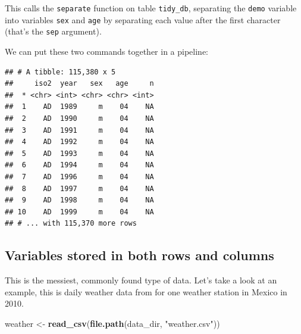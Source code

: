 \documentclass[]{book}
\newenvironment{Shaded}{\begin{snugshade}}{\end{snugshade}}
\newcommand{\KeywordTok}[1]{\textcolor[rgb]{0.13,0.29,0.53}{\textbf{#1}}}
\newcommand{\DataTypeTok}[1]{\textcolor[rgb]{0.13,0.29,0.53}{#1}}
\newcommand{\DecValTok}[1]{\textcolor[rgb]{0.00,0.00,0.81}{#1}}
\newcommand{\StringTok}[1]{\textcolor[rgb]{0.31,0.60,0.02}{#1}}
\newcommand{\OperatorTok}[1]{\textcolor[rgb]{0.81,0.36,0.00}{\textbf{#1}}}
\newcommand{\NormalTok}[1]{#1}
\theoremstyle{definition}
\theoremstyle{definition}
\theoremstyle{remark}
\begin{document}
This calls the \texttt{separate} function on table \texttt{tidy\_db},
separating the \texttt{demo} variable into variables \texttt{sex} and
\texttt{age} by separating each value after the first character (that's
the \texttt{sep} argument).

We can put these two commands together in a pipeline:

\begin{Shaded}
\end{Shaded}

\begin{verbatim}
## # A tibble: 115,380 x 5
##     iso2  year   sex   age     n
##  * <chr> <int> <chr> <chr> <int>
##  1    AD  1989     m    04    NA
##  2    AD  1990     m    04    NA
##  3    AD  1991     m    04    NA
##  4    AD  1992     m    04    NA
##  5    AD  1993     m    04    NA
##  6    AD  1994     m    04    NA
##  7    AD  1996     m    04    NA
##  8    AD  1997     m    04    NA
##  9    AD  1998     m    04    NA
## 10    AD  1999     m    04    NA
## # ... with 115,370 more rows
\end{verbatim}

\subsection{Variables stored in both rows and
columns}\label{variables-stored-in-both-rows-and-columns}

This is the messiest, commonly found type of data. Let's take a look at
an example, this is daily weather data from for one weather station in
Mexico in 2010.

\begin{Shaded}
\begin{Highlighting}[]
\NormalTok{weather <-}\StringTok{ }\KeywordTok{read_csv}\NormalTok{(}\KeywordTok{file.path}\NormalTok{(data_dir, }\StringTok{"weather.csv"}\NormalTok{))}
\end{Highlighting}
\end{Shaded}
\end{document}
